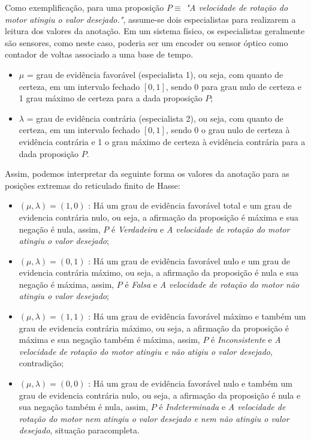 Como exemplificação, para uma proposição $P \equiv$ \emph{"A velocidade de rotação do motor atingiu o valor desejado."}, assume-se dois especialistas para realizarem a leitura dos valores da anotação. Em um sistema físico, os especialistas geralmente são sensores, como neste caso, poderia ser um encoder ou sensor óptico como contador de voltas associado a uma base de tempo.

\begin{itemize}
\item 
$\mu$ = grau de evidência favorável (especialista 1), ou seja, com quanto de certeza, em um intervalo fechado $[0,1]$, sendo 0 para grau nulo de certeza e 1 grau máximo de certeza para a dada proposição $P$;

\item
$\lambda$ = grau de evidência contrária (especialista 2), ou seja, com quanto de certeza, em um intervalo fechado $[0,1]$, sendo 0 o grau nulo de certeza à evidência contrária e 1 o grau máximo de certeza à evidência contrária para a dada proposição $P$.

\end{itemize}


Assim, podemos interpretar da seguinte forma os valores da anotação para as posições extremas do reticulado finito de Hasse:

\begin{itemize}
\item 
$(\mu, \lambda ) = (1,0)$ : Há um grau de evidência favorável total e um grau de evidencia contrária nulo, ou seja, a afirmação da proposição é máxima e sua negação é nula, assim,  $P$ é \emph{Verdadeira} e \emph{A velocidade de rotação do motor atingiu o valor desejado};

\item 
$(\mu, \lambda ) = (0,1)$ : Há um grau de evidência favorável nulo e um grau de evidencia contrária máximo, ou seja, a afirmação da proposição é nula e sua negação é máxima, assim,  $P$ é \emph{Falsa} e \emph{A velocidade de rotação do motor não atingiu o valor desejado};

\item 
$(\mu, \lambda ) = (1,1)$ : Há um grau de evidência favorável máximo e também um grau de evidencia contrária máximo, ou seja, a afirmação da proposição é máxima e sua negação também é máxima, assim,  $P$ é \emph{Inconsistente} e \emph{A velocidade de rotação do motor atingiu e não atigiu o valor desejado}, contradição;

\item 
$(\mu, \lambda ) = (0,0)$ : Há um grau de evidência favorável nulo e também um grau de evidencia contrária nulo, ou seja, a afirmação da proposição é nula e sua negação também é nula, assim,  $P$ é \emph{Indeterminada} e \emph{A velocidade de rotação do motor nem atingiu o valor desejado e nem não atingiu o valor desejado}, situação paracompleta.

\end{itemize}

